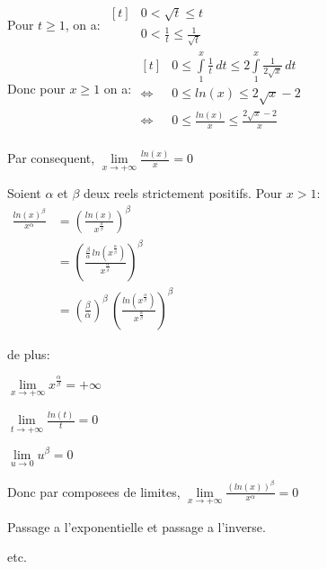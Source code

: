 \documentclass[12pt,twoside,a4paper]{article}
\begin{document}
		\begin{preuve}
			\begin{liste}
				\item Pour $t\geq1$, on a: $\begin{aligned}[t]&0<\sqrt{t}\leq t\\&0<\frac{1}{t}\leq\frac{1}{\sqrt{t}}\end{aligned}$\\
						Donc pour $x\geq1$ on a: $\begin{aligned}[t]&0\leq\int\limits_1^x\frac{1}{t}\,dt\leq2\int\limits_1^x\frac{1}{2\sqrt{x}}\,dt\\
						\iff&0\leq ln(x)\leq2\sqrt{x}-2\\
						\iff&0\leq\frac{ln(x)}{x}\leq\frac{2\sqrt{x}-2}{x}\end{aligned}$\\\\
						Par consequent, $\lim\limits_{x\rightarrow+\infty}\frac{ln(x)}{x}=0$
				\item Soient $\alpha$ et $\beta$ deux reels strictement positifs. Pour $x>1$:\\
						$\begin{aligned}
							\frac{ln(x)^\beta}{x^\alpha}&=\left(\frac{ln(x)}{x^\frac{\alpha}{\beta}}\right)^\beta\\
							&=\left(\frac{\frac{\beta}{\alpha}\,ln\left(x^\frac{\alpha}{\beta}\right)}{x^\frac{\alpha}{\beta}}\right)^\beta\\
							&=\left(\frac{\beta}{\alpha}\right)^\beta\,\left(\frac{ln\left(x^\frac{\alpha}{\beta}\right)}{x^\frac{\alpha}{\beta}}\right)^\beta
						\end{aligned}$
						\begin{tab}
							de plus:
							\begin{liste}
								\item $\lim\limits_{x\rightarrow+\infty}x^\frac{\alpha}{\beta}=+\infty$
								\item $\lim\limits_{t\rightarrow+\infty}\frac{ln(t)}{t}=0$
								\item $\lim\limits_{u\rightarrow0}u^\beta=0$
							\end{liste}
							Donc par composees de limites, $\lim\limits_{x\rightarrow+\infty}\frac{\left(ln(x)\right)^\beta}{x^\alpha}=0$
						\end{tab}
				\item Passage a l'exponentielle et passage a l'inverse.
				\item etc.
			\end{liste}
		\end{preuve}
\end{document}

